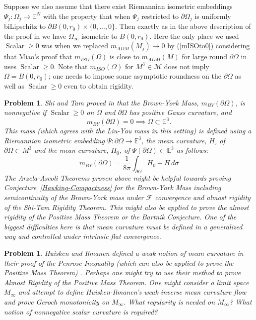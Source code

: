 \documentclass[12pt]{amsart}
\newtheorem{problem}[thm]{Problem}
\begin{document}
Suppose we also assume that there exist Riemannian isometric embeddings 
$\Psi_j: \Omega_j \to {\mathbb{E}}^N$ with the property that
when $\Psi_j$ restricted to $\partial \Omega_j$ is uniformly biLipschitz
to $\partial B(0,r_0)\times \{0,...,0\}$.  Then exactly as in the above description of the proof in \cite{HLS}
we have $\Omega_\infty$ isometric to $B(0,r_0)$.  Here the only place we
used ${\operatorname{Scalar}} \ge 0$ was when we replaced $m_{ADM}(M_j) \to 0$
by (\ref{mISOto0}) considering that Miao's proof that $m_{ISO}(\Omega)$
is close to $m_{ADM}(M)$ for large round $\partial \Omega$ 
in \cite{Fan-Shi-Tam} uses ${\operatorname{Scalar}} \ge 0$.  Note that $m_{ISO}(\Omega)$
for $M^3 \in \mathcal{M}$ does not imply $\Omega=B(0,r_0)$; one needs
to impose some asymptotic roundness on the $\partial \Omega$ 
as well as ${\operatorname{Scalar}} \ge 0$ even to obtain rigidity. 

 \begin{problem} \label{BY-Compactness}
 Shi and Tam proved in \cite{Shi-Tam-2002} that the Brown-York Mass,
 $m_{BY}(\partial \Omega)$,
  is nonnegative if ${\operatorname{Scalar}} \ge 0$ on $\Omega$
 and $\partial \Omega $ has positive Gauss curvature, and
  \begin{equation}\label{BY-rigidity}
 m_{BY}(\partial \Omega)=0 \implies 
 \Omega \subset \mathbb{E}^3.
 \end{equation}
This mass (which agrees with the Liu-Yau mass in this setting)
is defined using a Riemannian isometric embedding 
$\Psi: \partial \Omega \to \mathbb{E}^3$, the mean curvature, $H$,
of $\partial \Omega \subset M^3$ and the mean curvature, $H_0$, of
$\Psi(\partial \Omega) \subset {\mathbb{E}}^3$ as follows:
\begin{equation}
m_{BY}(\partial \Omega)= \frac{1}{8\pi}\int_{\partial \Omega} H_0 - H \, d\sigma
\end{equation}
The Arzela-Ascoli Theorems proven above might
be helpful towards proving Conjecture~\ref{Hawking-Compactness} for
the Brown-York Mass including
semicontinuity of the Brown-York mass under $\mathcal{F}$ convergence
and almost rigidity of the Shi-Tam Rigidity Theorem.   This might also
be applied to prove the almost rigidity of the Positive Mass Theorem
or the Bartnik Conjecture.  One of the biggest difficulties here is that 
mean curvature must be defined in a generalized way and controlled 
under intrinsic flat convergence.
\end{problem}

\begin{problem}\label{problem-HI}
Huisken and Ilmanen defined a weak notion of mean curvature
in their proof of the Penrose Inequality (which can also be applied
to prove the Positive Mass Theorem) \cite{Huisken-Ilmanen}.
Perhaps one might try to use their method to prove Almost Rigidity of
the Positive Mass Theorem.  One might consider a limit space
$M_\infty$ and attempt to define
Huisken-Ilmanen's weak inverse mean curvature flow and 
prove Geroch monotonicity on $M_\infty$.
What regularity is needed on $M_\infty$?  What notion of nonnegative
scalar curvature is required?
\end{problem}
\end{document}
